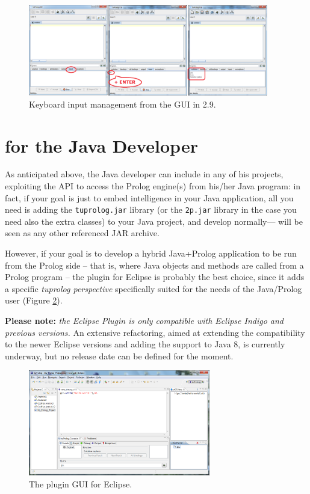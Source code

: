 \begin{figure}
\centering
  \includegraphics[width=10.5cm]{images/gui-InputFromConsole.png}
  \caption{Keyboard input management from the GUI in \tuprolog{} 2.9.}\label{fig:gui-InputFromConsole}
\end{figure}

\section{\tuprolog{} for the Java Developer}
\label{sec:java-user-perspective}

As anticipated above, the Java developer can include \tuprolog{} in any of his projects, exploiting the \tuprolog{} API to access the Prolog engine(s) from his/her Java program: in fact, if your goal is just to embed intelligence in your Java application, all you need is adding the \texttt{tuprolog.jar} library (or the \texttt{2p.jar} library in the case you need also the extra classes) to your Java project, and develop normally---\tuprolog{} will be seen as any other referenced JAR archive.

However, if your goal is to develop a hybrid Java+Prolog application to be run from the Prolog side -- that is, where Java objects and methods are called from a Prolog program -- the \tuprolog{} plugin for Eclipse is probably the best choice, since it adds a specific \textit{tuprolog perspective} specifically suited for the needs of the Java/Prolog user (Figure \ref{fig:tuprologPluginGUI}).

\textbf{Please note:} \textit{the Eclipse Plugin is only compatible with Eclipse Indigo and previous versions.} An extensive refactoring, aimed at extending the compatibility to the newer Eclipse versions and adding the support to Java 8, is currently underway, but no release date can be defined for the moment.

\begin{figure}
\centering
  \includegraphics[width=300px]{images/tuprologPluginGUI.png}
  \caption{The \tuprolog{} plugin GUI for Eclipse.}\label{fig:tuprologPluginGUI}
\end{figure}

